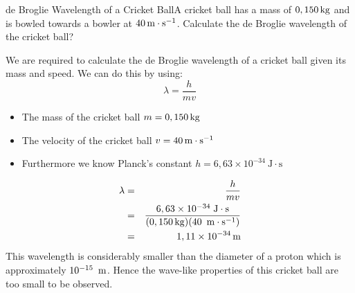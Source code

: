 \begin{wex}{de Broglie Wavelength of a Cricket Ball}{A cricket ball has a mass of $0,150\,\mathrm{kg}$ and is bowled towards a bowler at $40\,\mathrm{m \cdot s^{-1}}$. Calculate the de Broglie wavelength of the cricket ball?}
{
We are required to calculate the de Broglie wavelength of a cricket ball given its mass and speed. We can do this by using:
$$\lambda=\frac{h}{mv}$$

\begin{itemize}
\item The mass of the cricket ball $m=0,150\,\mathrm{kg}$
\item The velocity of the cricket ball $v=40\,\mathrm{m \cdot s^{-1}}$
\item Furthermore we know Planck's constant $h=6,63\times 10^{-34}~\mathrm{J\cdot s}$
\end{itemize}

\begin{eqnarray*}
\lambda&=&\frac{h}{mv}\\
&=&\frac{6,63 \times 10^{-34}\;\mathrm{J\cdot s}}{(0,150\,\mathrm{kg})(40~\,\mathrm{m \cdot s^{-1}})}\\
&=& 1,11 \times 10^{-34}\,\rm{m}
\end{eqnarray*}
This wavelength is considerably smaller than the diameter of a proton which is approximately $10^{-15}~\,\rm{m}$. Hence the wave-like properties of this cricket ball are too small to be  observed.
}
\end{wex}

